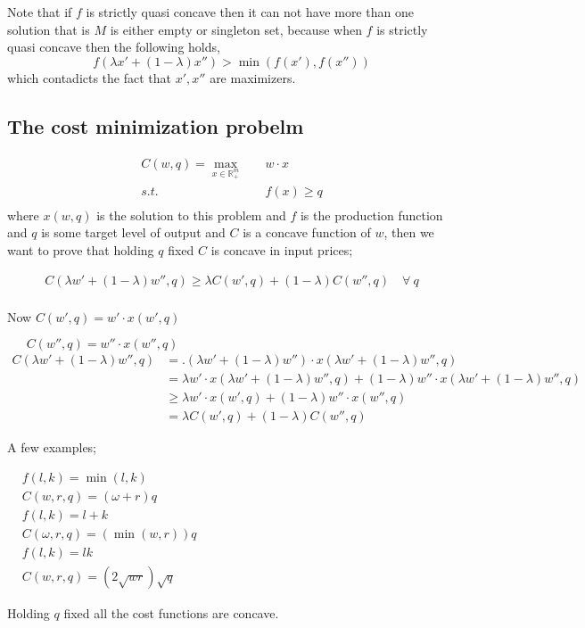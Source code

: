 \documentclass[12pt,a4paper]{article}
\begin{document}
Note that if \(f\) is strictly quasi concave then it can not have more than one solution that is \(M\) is either empty or singleton set, because when \(f\) is strictly quasi concave then the following holds,
\begin{equation*}
    f(\lambda x' + (1-\lambda)x'') > \min(f(x'),f(x'')) 
\end{equation*} 
which contadicts the fact that \(x',x''\) are maximizers.      

\subsection{ The cost minimization probelm}
 \begin{align*}
      C(w,q) = \max_{x \in \mathbb{R}^m_{+}} & \quad w\cdot x \\
       s.t. & \quad f(x) \geq q \\
\end{align*}
where \(x(w,q)\) is the solution to this problem and \(f\) is the production function and \(q\) is some target level of output and \(C\) is a concave function of \(w\), then we want to prove that holding \(q\) fixed \(C\) is concave in input prices;

 \begin{align*}
    C(\lambda w' + (1-\lambda)w'' ,q) \geq \lambda C(w',q) + (1-\lambda)C(w'',q) \quad \forall \ q\\
\end{align*}

Now \(C(w',q)=w' \cdot x(w',q)\) 

\( \ \ \ \ \ \ \ C(w'',q)=w'' \cdot x(w'',q)\) 
 \begin{align*}
    C(\lambda w' +(1-\lambda)w'', q)&= . (\lambda w' +(1-\lambda)w'') \cdot x(\lambda w' +(1-\lambda)w'',q)\\
    &=\lambda w' \cdot x(\lambda w' +(1-\lambda)w'', q)+ (1-\lambda)w''\cdot x(\lambda w' +(1-\lambda)w'',q)\\
    &\geq \lambda w' \cdot x(w',q) + (1-\lambda) w'' \cdot x(w'',q)\\
    &=\lambda C(w',q) + (1-\lambda)C(w'',q)
\end{align*} 

A few examples;

\(\begin{aligned} & f(l, k)=\min (l, k) \\ & C(w, r, q)=(\omega+r) q \\ 
    & f(l, k)=l+k \\ & C(\omega, r, q)=(\min (w, r)) q \\ 
    & f(l, k)=l k \\ & C(w, r, q)=(2 \sqrt{w r}) \sqrt{q}
\end{aligned}\)

Holding \(q\) fixed all the cost functions are concave. 
\end{document}
